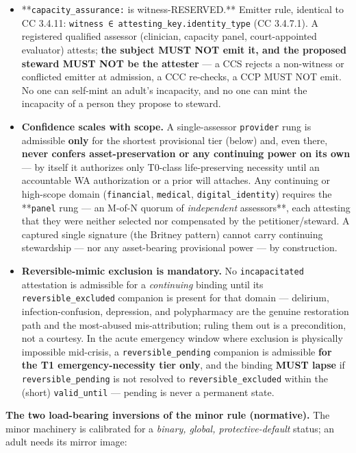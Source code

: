 \documentclass[11pt]{article}
\begin{document}
\begin{itemize}\setlength\itemsep{0pt}
\item **\texttt{capacity\_assurance:} is witness-RESERVED.** Emitter rule, identical to CC 3.4.11: \texttt{witness ∈ attesting\_key.identity\_type} (CC 3.4.7.1). A registered qualified assessor (clinician, capacity panel, court-appointed evaluator) attests; \textbf{the subject MUST NOT emit it, and the proposed steward MUST NOT be the attester} — a CCS rejects a non-witness or conflicted emitter at admission, a CCC re-checks, a CCP MUST NOT emit. No one can self-mint an adult's incapacity, and no one can mint the incapacity of a person they propose to steward.
\item \textbf{Confidence scales with scope.} A single-assessor \texttt{provider} rung is admissible \textbf{only} for the shortest provisional tier (below) and, even there, \textbf{never confers asset-preservation or any continuing power on its own} — by itself it authorizes only T0-class life-preserving necessity until an accountable WA authorization or a prior will attaches. Any continuing or high-scope domain (\texttt{financial}, \texttt{medical}, \texttt{digital\_identity}) requires the **\texttt{panel} rung — an M-of-N quorum of \textit{independent} assessors**, each attesting that they were neither selected nor compensated by the petitioner/steward. A captured single signature (the Britney pattern) cannot carry continuing stewardship — nor any asset-bearing provisional power — by construction.
\item \textbf{Reversible-mimic exclusion is mandatory.} No \texttt{incapacitated} attestation is admissible for a \textit{continuing} binding until its \texttt{reversible\_excluded} companion is present for that domain — delirium, infection-confusion, depression, and polypharmacy are the genuine restoration path and the most-abused mis-attribution; ruling them out is a precondition, not a courtesy. In the acute emergency window where exclusion is physically impossible mid-crisis, a \texttt{reversible\_pending} companion is admissible \textbf{for the T1 emergency-necessity tier only}, and the binding \textbf{MUST lapse} if \texttt{reversible\_pending} is not resolved to \texttt{reversible\_excluded} within the (short) \texttt{valid\_until} — pending is never a permanent state.
\end{itemize}


\textbf{The two load-bearing inversions of the minor rule (normative).} The minor machinery is calibrated for a \textit{binary, global, protective-default} status; an adult needs its mirror image:
\end{document}
